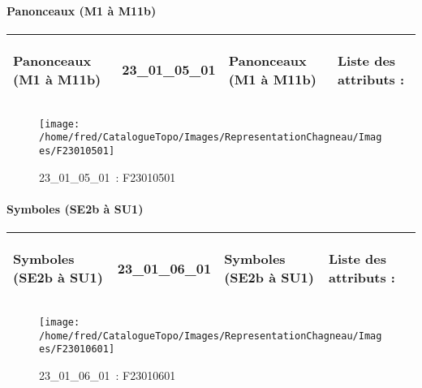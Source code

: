 \documentclass[12pt,titlepage,oneside]{book}
\begin{document}
\paragraph{Panonceaux (M1 à M11b)}
\noindent
\vspace{\baselineskip}

\renewcommand{\arraystretch}{1.2}
\begin{supertabular}{|p{10cm}|c|p{13cm}|p{12cm}|}
 Panonceaux (M1 à M11b) & 23\_01\_05\_01 & Panonceaux (M1 à M11b) & Liste des attributs :
\begin{enumerate}
\end{enumerate}
\\
\hline
\end{supertabular}
\begin{figure}[h!]
  \hfill         %
  \begin{minipage}[t]{3cm}
    \begin{center}
      \texttt{[image: /home/fred/CatalogueTopo/Images/RepresentationChagneau/Images/F23010501]}
      \caption[~23\_01\_05\_01]{\small{23\_01\_05\_01~:} \tiny{F23010501}}\label{F23010501}
    \end{center}
  \end{minipage}
\end{figure}


\paragraph{Symboles (SE2b à SU1)}
\noindent
\vspace{\baselineskip}

\renewcommand{\arraystretch}{1.2}
\begin{supertabular}{|p{10cm}|c|p{13cm}|p{12cm}|}
 Symboles (SE2b à SU1) & 23\_01\_06\_01 & Symboles (SE2b à SU1) & Liste des attributs :
\begin{enumerate}
\end{enumerate}
\\
\hline
\end{supertabular}
\begin{figure}[h!]
  \hfill         %
  \begin{minipage}[t]{3cm}
    \begin{center}
      \texttt{[image: /home/fred/CatalogueTopo/Images/RepresentationChagneau/Images/F23010601]}
      \caption[~23\_01\_06\_01]{\small{23\_01\_06\_01~:} \tiny{F23010601}}\label{F23010601}
    \end{center}
  \end{minipage}
\end{figure}
\end{document}
